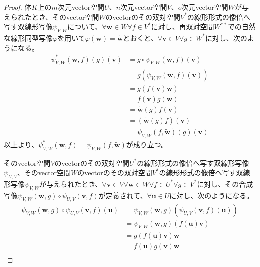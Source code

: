 \documentclass[dvipdfmx]{jsarticle}
\begin{document}
\begin{proof}
体$K$上の$m$次元vector空間$U$、$n$次元vector空間$V$、$o$次元vector空間$W$が与えられたとき、そのvector空間$W$のvectorのその双対空間$V^{*}$の線形形式の像倍へ写す双線形写像$\psi_{V,W}$について、$\forall\mathbf{w} \in W\forall f \in V^{*}$に対し、再双対空間$W^{**}$での自然な線形同型写像$\varphi$を用いて$\varphi\left( \mathbf{w} \right) = \widetilde{\mathbf{w}}$とおくと、$\forall\mathbf{v} \in V\forall g \in W^{*}$に対し、次のようになる。
\begin{align*}
\psi_{V,W}^{*}\left( \mathbf{w},f \right)(g)\left( \mathbf{v} \right) &= g \circ \psi_{V,W}\left( \mathbf{w},f \right)\left( \mathbf{v} \right)\\
&= g\left( \psi_{V,W}\left( \mathbf{w},f \right)\left( \mathbf{v} \right) \right)\\
&= g\left( f\left( \mathbf{v} \right)\mathbf{w} \right)\\
&= f\left( \mathbf{v} \right)g\left( \mathbf{w} \right)\\
&= \widetilde{\mathbf{w}}(g)f\left( \mathbf{v} \right)\\
&= \left( \widetilde{\mathbf{w}}(g)f \right)\left( \mathbf{v} \right)\\
&= \psi_{V,W}\left( f,\widetilde{\mathbf{w}} \right)(g)\left( \mathbf{v} \right)
\end{align*}
以上より、$\psi_{V,W}^{*}\left( \mathbf{w},f \right) = \psi_{V,W}\left( f,\widetilde{\mathbf{w}} \right)$が成り立つ。\par
そのvector空間$V$のvectorのその双対空間$U^{*}$の線形形式の像倍へ写す双線形写像$\psi_{U,V}$、そのvector空間$W$のvectorのその双対空間$V^{*}$の線形形式の像倍へ写す双線形写像$\psi_{V,W}$が与えられたとき、$\forall\mathbf{v} \in V\forall\mathbf{w} \in W\forall f \in U^{*}\forall g \in V^{*}$に対し、その合成写像$\psi_{V,W}\left( \mathbf{w},g \right) \circ \psi_{U,V}\left( \mathbf{v},f \right)$が定義されて、$\forall\mathbf{u} \in U$に対し、次のようになる。
\begin{align*}
\psi_{V,W}\left( \mathbf{w},g \right) \circ \psi_{U,V}\left( \mathbf{v},f \right)\left( \mathbf{u} \right) &= \psi_{V,W}\left( \mathbf{w},g \right)\left( \psi_{U,V}\left( \mathbf{v},f \right)\left( \mathbf{u} \right) \right)\\
&= \psi_{V,W}\left( \mathbf{w},g \right)\left( f\left( \mathbf{u} \right)\mathbf{v} \right)\\
&= g\left( f\left( \mathbf{u} \right)\mathbf{v} \right)\mathbf{w}\\
&= f\left( \mathbf{u} \right)g\left( \mathbf{v} \right)\mathbf{w}\\

\end{align*}
\end{proof}
\end{document}
